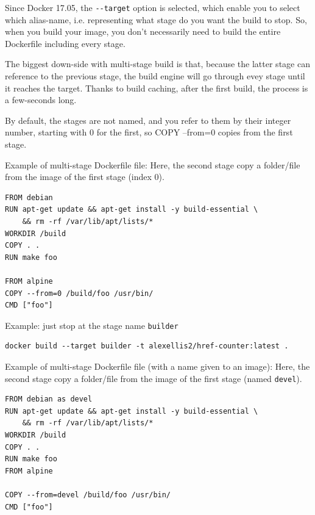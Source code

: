 Since Docker 17.05, the \verb!--target! option is selected, which enable you to
select which alias-name, i.e. representing what stage do you want the build to
stop. So, when you build your image, you don’t necessarily need to build the
entire Dockerfile including every stage.

\begin{mdframed}

The biggest down-side with multi-stage build is that, because the latter stage can reference to the previous stage,
the build engine will go through evey stage until it reaches the target. 
Thanks to build caching, after the first build, the process is a few-seconds long.

\end{mdframed}

By default, the stages are not named, and you refer to them by their integer
number, starting with 0 for the first, so COPY --from=0 copies from the first
stage.

Example of multi-stage Dockerfile file: Here, the second stage copy a folder/file from the image 
of the first stage (index 0).
\begin{verbatim}
FROM debian
RUN apt-get update && apt-get install -y build-essential \
    && rm -rf /var/lib/apt/lists/*
WORKDIR /build
COPY . .
RUN make foo

FROM alpine
COPY --from=0 /build/foo /usr/bin/
CMD ["foo"]
\end{verbatim}

Example: just stop at the stage name \verb!builder!
\begin{verbatim}
docker build --target builder -t alexellis2/href-counter:latest .
\end{verbatim}


Example of multi-stage Dockerfile file (with a name given to an image): Here,
the second stage copy a folder/file from the image of the first stage (named
\verb!devel!).

\begin{verbatim}
FROM debian as devel
RUN apt-get update && apt-get install -y build-essential \
    && rm -rf /var/lib/apt/lists/*
WORKDIR /build
COPY . .
RUN make foo
FROM alpine

COPY --from=devel /build/foo /usr/bin/
CMD ["foo"]
\end{verbatim}


